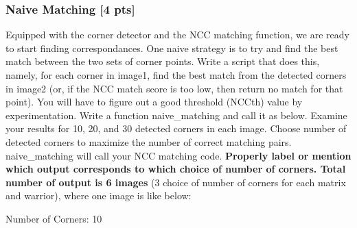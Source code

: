 \documentclass[11pt]{article}
\begin{document}
    \hypertarget{naive-matching-4-pts}{%
\subsubsection{Naive Matching {[}4 pts{]}}\label{naive-matching-4-pts}}

Equipped with the corner detector and the NCC matching function, we are
ready to start finding correspondances. One naive strategy is to try and
find the best match between the two sets of corner points. Write a
script that does this, namely, for each corner in image1, find the best
match from the detected corners in image2 (or, if the NCC match score is
too low, then return no match for that point). You will have to figure
out a good threshold (NCCth) value by experimentation. Write a function
naive\_matching and call it as below. Examine your results for 10, 20,
and 30 detected corners in each image. Choose number of detected corners
to maximize the number of correct matching pairs. naive\_matching will
call your NCC matching code. \textbf{Properly label or mention which
output corresponds to which choice of number of corners. Total number of
output is 6 images} (3 choice of number of corners for each matrix and
warrior), where one image is like below:

Number of Corners: 10 
\end{document}

